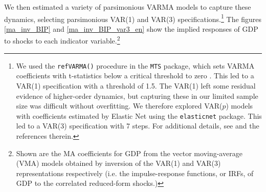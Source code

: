 \documentclass[11pt,a4paper]{article}
\begin{document}
We then estimated a variety of parsimonious VARMA models to capture these dynamics, selecting parsimonious VAR(1) and VAR(3) specifications.\footnote{We used the \texttt{refVARMA()} procedure in the \cite{MTSpackage} \texttt{MTS} package, which sets VARMA coefficients with t-statistics below a critical threshold to zero \citep[see][]{tsay2013multivariate}.  This led to a VAR(1) specification with a threshold of 1.5. The VAR(1) left some residual evidence of higher-order dynamics, but capturing these in our limited sample size was difficult without overfitting. We therefore explored VAR($p$) models with coefficients estimated by Elastic Net using the \cite{ElasticNet} \texttt{elasticnet} package.  This led to a VAR(3) specification with 7 steps. For additional details, see \cite{ElasticNet} and the references therein.} The figures \ref{ma_inv_BIP} and \ref{ma_inv_BIP_var3_en} show the implied responses of GDP to shocks to each indicator variable.\footnote{Shown are the MA coefficients for GDP from the vector moving-average (VMA) models obtained by inversion of the VAR(1) and VAR(3) representations respectively (i.e. the impulse-response functions, or IRFs, of GDP to the correlated reduced-form shocks.)} 

%
%



%
%
%
\end{document}
